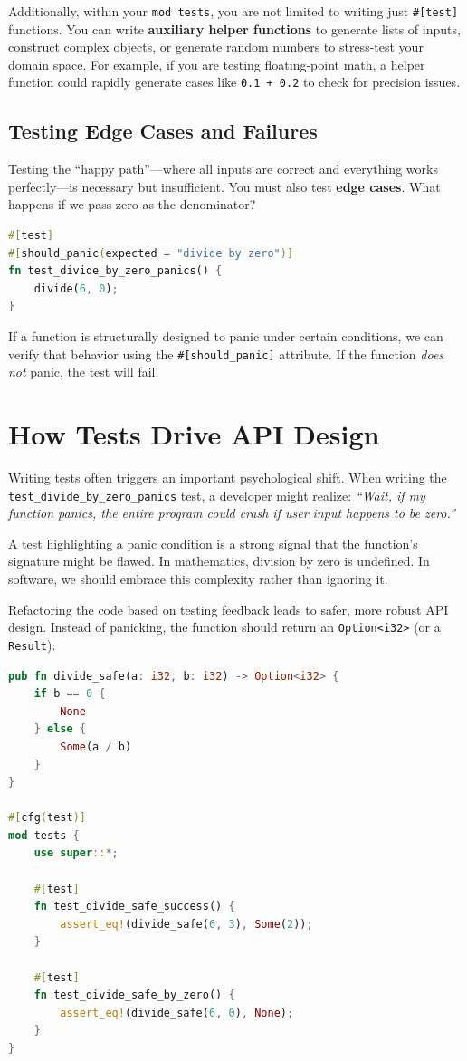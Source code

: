 Additionally, within your \texttt{mod tests}, you are not limited to writing just \texttt{\#[test]} functions. You can write \textbf{auxiliary helper functions} to generate lists of inputs, construct complex objects, or generate random numbers to stress-test your domain space. For example, if you are testing floating-point math, a helper function could rapidly generate cases like \texttt{0.1 + 0.2} to check for precision issues.

\subsection{Testing Edge Cases and Failures}
Testing the ``happy path''---where all inputs are correct and everything works perfectly---is necessary but insufficient. You must also test \textbf{edge cases}. What happens if we pass zero as the denominator?

\begin{lstlisting}[language=Rust]
#[test]
#[should_panic(expected = "divide by zero")]
fn test_divide_by_zero_panics() {
    divide(6, 0);
}
\end{lstlisting}

If a function is structurally designed to panic under certain conditions, we can verify that behavior using the \texttt{\#[should\_panic]} attribute. If the function \textit{does not} panic, the test will fail!

\section{How Tests Drive API Design}

Writing tests often triggers an important psychological shift. When writing the \texttt{test\_divide\_by\_zero\_panics} test, a developer might realize: \textit{``Wait, if my function panics, the entire program could crash if user input happens to be zero.''} 

A test highlighting a panic condition is a strong signal that the function's signature might be flawed. In mathematics, division by zero is undefined. In software, we should embrace this complexity rather than ignoring it. 

Refactoring the code based on testing feedback leads to safer, more robust API design. Instead of panicking, the function should return an \texttt{Option<i32>} (or a \texttt{Result}):

\begin{lstlisting}[language=Rust]
pub fn divide_safe(a: i32, b: i32) -> Option<i32> {
    if b == 0 {
        None
    } else {
        Some(a / b)
    }
}

#[cfg(test)]
mod tests {
    use super::*;

    #[test]
    fn test_divide_safe_success() {
        assert_eq!(divide_safe(6, 3), Some(2));
    }

    #[test]
    fn test_divide_safe_by_zero() {
        assert_eq!(divide_safe(6, 0), None);
    }
}
\end{lstlisting}

